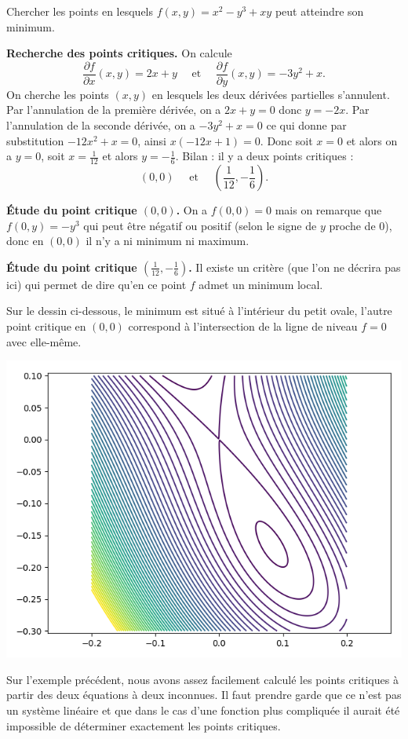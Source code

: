 \documentclass[11pt,class=report,crop=false]{standalone}
\begin{document}
\begin{exemple}
Chercher les points en lesquels $f(x,y) = x^2-y^3+xy$ peut atteindre son minimum.

\textbf{Recherche des points critiques.}
On calcule 
$$\frac{\partial f}{\partial x}(x,y) = 2x+y 
\quad \text{ et } \quad 
\frac{\partial f}{\partial y}(x,y) = -3y^2+x.$$
On cherche les points $(x,y)$ en lesquels les deux dérivées partielles s'annulent.
Par l'annulation de la première dérivée, on a $2x+y=0$ donc $y=-2x$.
Par l'annulation de la seconde dérivée, on a $-3y^2+x=0$ ce qui donne par substitution
$-12x^2+x=0$, ainsi $x(-12x+1)=0$.
Donc soit $x=0$ et alors on a $y=0$, soit $x=\frac1{12}$ et alors $y=-\frac16$.
Bilan : il y a deux points critiques :
$$\left(0,0\right) \quad \text{ et } \quad \left(\frac1{12},-\frac16\right).$$

\textbf{\'Etude du point critique $(0,0)$.}
On a $f(0,0)=0$ mais on remarque que $f(0,y)=-y^3$ qui peut être négatif ou positif (selon le signe de $y$ proche de $0$), donc en $(0,0)$ il n'y a ni minimum ni maximum.

\textbf{\'Etude du point critique $(\frac1{12},-\frac16)$.}
Il existe un critère (que l'on ne décrira pas ici) qui permet de dire qu'en ce point $f$ admet un minimum local.

Sur le dessin ci-dessous, le minimum est situé à l'intérieur du petit ovale, l'autre point critique en $(0,0)$ correspond à l'intersection de la ligne de niveau $f=0$ avec elle-même.
\begin{center}
\includegraphics[scale=\myscale,scale=0.7]{figures/gradient-surface-6}
\end{center}

\end{exemple}
Sur l'exemple précédent, nous avons assez facilement calculé les points critiques à partir des deux équations à deux inconnues. Il faut prendre garde que ce n'est pas un système linéaire et que dans le cas d'une fonction plus compliquée il aurait été impossible de déterminer exactement les points critiques.
\end{document}
